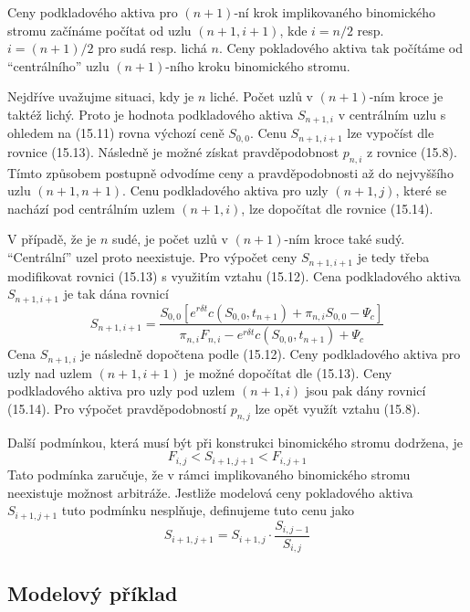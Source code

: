 \documentclass[a4paper]{book}
\begin{document}
Ceny podkladového aktiva pro $(n+1)$-ní krok implikovaného binomického stromu začínáme počítat od uzlu $(n+1, i + 1)$, kde $i=n/2$ resp. $i = (n+1)/2$ pro sudá resp. lichá $n$. Ceny pokladového aktiva tak počítáme od ``centrálního'' uzlu $(n+1)$-ního kroku binomického stromu.

Nejdříve uvažujme situaci, kdy je $n$ liché. Počet uzlů v $(n+1)$-ním kroce je taktéž lichý. Proto je hodnota podkladového aktiva $S_{n+1,i}$ v centrálním uzlu s ohledem na (15.11) rovna výchozí ceně $S_{0,0}$. Cenu $S_{n+1,i+1}$ lze vypočíst dle rovnice (15.13). Následně je možné získat pravděpodobnost $p_{n,i}$ z rovnice (15.8). Tímto způsobem postupně odvodíme ceny a pravděpodobnosti až do nejvyššího uzlu $(n+1, n+1)$. Cenu podkladového aktiva pro uzly $(n+1,j)$, které se nachází pod centrálním uzlem $(n+1,i)$, lze dopočítat dle rovnice (15.14).

V případě, že je $n$ sudé, je počet uzlů v $(n+1)$-ním kroce také sudý. ``Centrální'' uzel proto neexistuje. Pro výpočet ceny $S_{n+1,i+1}$ je tedy třeba modifikovat rovnici (15.13) s využitím vztahu (15.12). Cena podkladového aktiva $S_{n+1,i+1}$ je tak dána rovnicí
\begin{equation*}
S_{n+1,i+1}=\frac{S_{0,0}[e^{r \delta t}c(S_{0,0},t_{n+1})+ \pi_{n,i}S_{0,0}-\Psi_c]}{\pi_{n,i}F_{n,i}-e^{r \delta t}c(S_{0,0},t_{n+1})+\Psi_c}
\end{equation*}
Cena $S_{n+1,i}$ je následně dopočtena podle (15.12). Ceny podkladového aktiva pro uzly nad uzlem $(n+1,i+1)$ je možné dopočítat dle (15.13). Ceny podkladového aktiva pro uzly pod uzlem $(n+1,i)$ jsou pak dány rovnicí (15.14). Pro výpočet pravděpodobností $p_{n,j}$ lze opět využít vztahu (15.8).

Další podmínkou, která musí být při konstrukci binomického stromu dodržena, je
\begin{equation}
F_{i, j} < S_{i+1, j+1} < F_{i, j + 1}
\end{equation}
Tato podmínka zaručuje, že v rámci implikovaného binomického stromu neexistuje možnost arbitráže. Jestliže modelová ceny pokladového aktiva $S_{i+1, j+1}$ tuto podmínku nesplňuje, definujeme tuto cenu jako
\begin{equation*}
S_{i+1, j + 1} = S_{i+1,j} \cdot \frac{S_{i, j-1}}{S_{i, j}}
\end{equation*}

\subsection{Modelový příklad}
\end{document}
